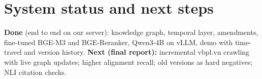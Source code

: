 \documentclass{article} %
\begin{document}
\vspace{-1mm}
\section{System status and next steps}
\vspace{-1mm}
\textbf{Done} (end to end on our server): knowledge graph, temporal layer, amendments, fine-tuned \mbox{BGE-M3} and
BGE-Reranker, Qwen3-4B on vLLM, demo with time-travel and version history.
\textbf{Next (final report):} incremental vbpl.vn crawling with live graph updates; higher alignment recall; old
versions as hard negatives; NLI citation checks.
\end{document}
